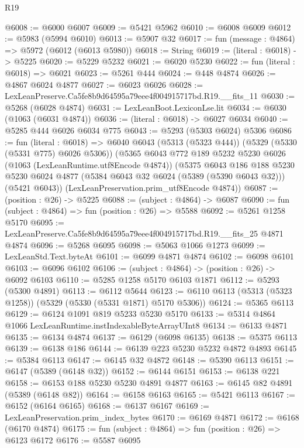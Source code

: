 \begin{lexlean}{R19}
\begin{coremodule}
@6008 := @6000 @6007
@6009 := @5421 @5962
@6010 := @6008 @6009
@6012 := @5983 (@5994 @6010)
@6013 := @5907 @32
@6017 := fun (message : @4864) => @5972 (@6012 (@6013 @5980))
@6018 := String
@6019 := (literal : @6018) -> @5225
@6020 := @5229 @5232
@6021 := @6020 @5230
@6022 := fun (literal : @6018) => @6021
@6023 := @5261 @444
@6024 := @448 @4874
@6026 := @4867 @6024 @4877
@6027 := @6023 @6026
@6028 := LexLeanPreserve.Ca5fe8b9d64595a79eee4f004915717bd.R19.__fits_11
@6030 := @5268 (@6028 @4874)
@6031 := LexLeanBoot.LexiconLse.lit
@6034 := @6030 (@1063 (@6031 @4874))
@6036 := (literal : @6018) -> @6027 @6034
@6040 := @5285 @444 @6026 @6034 @775
@6043 := @5293 (@5303 @6024) @5306
@6086 := fun (literal : @6018) =>
  @6040
    @6043
    (@5313 (@5323 @444))
    (@5329 (@5330 (@5331 @775) @6026 @5306))
    (@5365
      @6043
      @772
      @189
      @5232
      @5230
      @6026
      (@1063 (LexLeanRuntime.utf8Encode @4874))
      (@5375
        @6043
        @186
        @188
        @5230
        @5230
        @6024
        @4877
        (@5384 @6043 @32 @6024 (@5389 (@5390 @6043 @32)))
        (@5421 @6043))
      (LexLeanPreservation.prim_utf8Encode @4874))
@6087 := (position : @26) -> @5225
@6088 := (subject : @4864) -> @6087
@6090 := fun (subject : @4864) => fun (position : @26) => @5588
@6092 := @5261 @1258 @5170
@6095 := LexLeanPreserve.Ca5fe8b9d64595a79eee4f004915717bd.R19.__fits_25 @4871 @4874
@6096 := @5268 @6095
@6098 := @5063 @1066 @1273
@6099 := LexLeanStd.Text.byteAt
@6101 := @6099 @4871 @4874
@6102 := @6098 @6101
@6103 := @6096 @6102
@6106 := (subject : @4864) -> (position : @26) -> @6092 @6103
@6110 := @5285 @1258 @5170 @6103 @1871
@6112 := @5293 (@5300 @4891)
@6113 := @6112 @5644
@6123 := @6110 @6113 (@5313 (@5323 @1258)) (@5329 (@5330 (@5331 @1871) @5170 @5306))
@6124 := @5365 @6113
@6129 := @6124 @1091 @819 @5233 @5230 @5170
@6133 := @5314 @4864 @1066 LexLeanRuntime.instIndexableByteArrayUInt8
@6134 := @6133 @4871
@6135 := @6134 @4874
@6137 := @6129 (@6098 @6135)
@6138 := @5375 @6113
@6139 := @6138 @186
@6144 := @6139 @223 @5230 @5232 @4872 @4893
@6145 := @5384 @6113
@6147 := @6145 @32 @4872
@6148 := @5390 @6113
@6151 := @6147 (@5389 (@6148 @32))
@6152 := @6144 @6151
@6153 := @6138 @221
@6158 := @6153 @188 @5230 @5230 @4891 @4877
@6163 := @6145 @82 @4891 (@5389 (@6148 @82))
@6164 := @6158 @6163
@6165 := @5421 @6113
@6167 := @6152 (@6164 @6165)
@6168 := @6137 @6167
@6169 := LexLeanPreservation.prim_index_bytes
@6170 := @6169 @4871
@6172 := @6168 (@6170 @4874)
@6175 := fun (subject : @4864) => fun (position : @26) => @6123 @6172
@6176 := @5587 @6095

\end{coremodule}
\end{lexlean}
